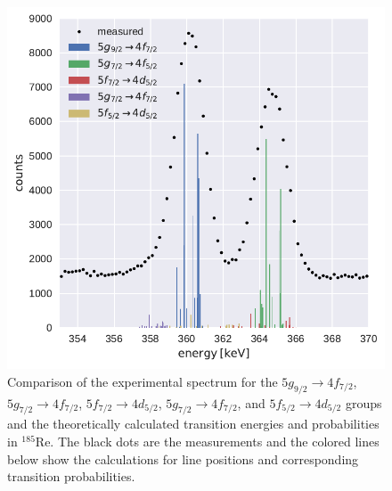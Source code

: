 \begin{figure}%
\raggedright
\includegraphics[width=1.02\textwidth]{pics/comparison}
\caption{
Comparison of the experimental spectrum for the $5g_{9/2}\rightarrow4f_{7/2}$, $5g_{7/2}\rightarrow4f_{7/2}$, $5f_{7/2}\rightarrow4d_{5/2}$, $5g_{7/2}\rightarrow4f_{7/2}$, and $5f_{5/2}\rightarrow4d_{5/2}$ groups and the theoretically calculated transition energies and probabilities in $^{185}$Re. The black dots are the measurements and the colored lines below show the calculations for line positions and corresponding transition probabilities.
}
\label{fig:re54}
\end{figure}
%
%
%
%
%
